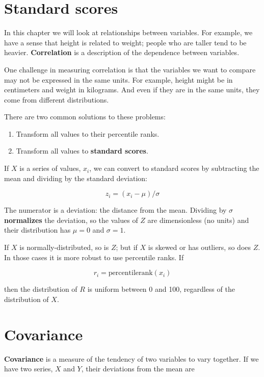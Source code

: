 \documentclass[12pt]{book}
\begin{document}
\section{Standard scores}

In this chapter we will look at relationships between variables.  For
example, we have a sense that height is related to weight; people who
are taller tend to be heavier.  {\bf Correlation} is a description of
the dependence between variables.

One challenge in measuring correlation is that the variables we want
to compare may not be expressed in the same units.  For example, height
might be in centimeters and weight in kilograms.  And even if they are
in the same units, they come from different distributions.

There are two common solutions to these problems:

\begin{enumerate}

\item Transform all values to their percentile ranks.

\item Transform all values to {\bf standard scores}.

\end{enumerate}

If $X$ is a series of values, $x_i$, we can convert to standard
scores by subtracting the mean and dividing by the standard deviation:

\[ z_i = (x_i - \mu) / \sigma \]

The numerator is a deviation: the distance from the mean.  Dividing by
$\sigma$ {\bf normalizes} the deviation, so the values of $Z$ are
dimensionless (no units) and their distribution has $\mu=0$ and
$\sigma=1$.

If $X$ is normally-distributed, so is $Z$; but if $X$ is skewed
or has outliers, so does $Z$.  In those cases it is more robust to
use percentile ranks.  If

\[ r_i = \mathrm{percentile rank} (x_i) \]

then the distribution of $R$ is uniform between 0 and 100, regardless of
the distribution of $X$.


\section{Covariance}

{\bf Covariance} is a measure of the tendency of two variables
to vary together.  If we have two series, $X$ and $Y$, their
deviations from the mean are
\end{document}
